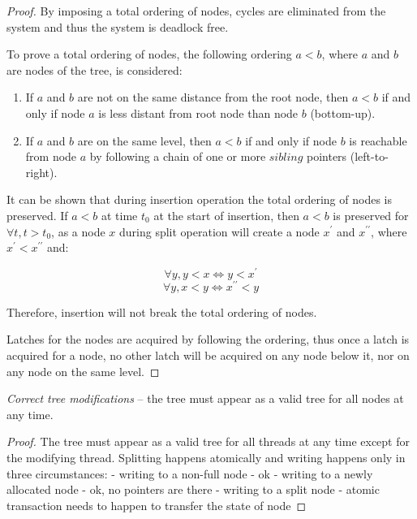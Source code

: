 \begin{proof}
  By imposing a total ordering of nodes, cycles are eliminated from the system and thus the system is deadlock free.

  To prove a total ordering of nodes, the following ordering $a < b$, where $a$ and $b$ are nodes of the tree, is considered:

  \begin{enumerate}
    \item If $a$ and $b$ are not on the same distance from the root node, then $a < b$ if and only if node $a$ is less distant from root node than node $b$ (bottom-up).
    \item If $a$ and $b$ are on the same level, then $a < b$ if and only if node $b$ is reachable from node $a$ by following a chain of one or more $sibling$ pointers (left-to-right).
  \end{enumerate}

  It can be shown that during insertion operation the total ordering of nodes is preserved. If $a < b$ at time $t_0$ at the start of insertion, then $a < b$ is preserved for $\forall t, t > t_0$, as a node $x$ during split operation will create a node $x^\prime$ and $x^{\prime\prime}$, where $x^\prime < x^{\prime\prime}$ and:

  $$\forall y, y < x \Leftrightarrow y < x^\prime$$
  $$\forall y, x < y \Leftrightarrow x^{\prime\prime} < y$$

  Therefore, insertion will not break the total ordering of nodes.

  Latches for the nodes are acquired by following the ordering, thus once a latch is acquired for a node, no other latch will be acquired on any node below it, nor on any node on the same level.
\end{proof}

\begin{theorem}
  \textit{Correct tree modifications} -- the tree must appear as a valid tree for all nodes at any time.
\end{theorem}


\begin{proof}
  The tree must appear as a valid tree for all threads at any time except for the modifying thread. Splitting happens atomically and writing happens only in three circumstances:
  - writing to a non-full node - ok
  - writing to a newly allocated   node - ok, no pointers are there
  - writing to a split node - atomic transaction needs to happen to transfer the state of node
\end{proof}

